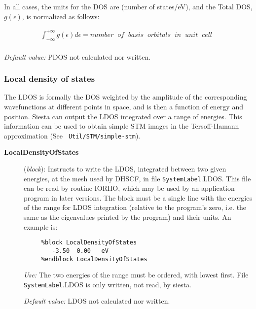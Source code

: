 \documentclass[11pt]{article}
\begin{document}
\begin{description}
In all cases, the units for the DOS are (number of states/eV), and the
Total DOS, $g \left(\epsilon\right)$, is normalized as follows:

\begin{eqnarray}
   \int_{-\infty}^{+\infty} g \left(\epsilon\right) d\epsilon =
   number \;\; of \;\; basis \;\; orbitals \;\; in \;\;  unit \;\; cell \;\;
   \nonumber \\
\end{eqnarray}


{\it Default value:} PDOS not calculated nor written.
\end{description}


\subsubsection{Local density of states}

The LDOS is formally the DOS weighted by the amplitude of the
corresponding wavefunctions at different points in space, and is then
a function of energy and position. {\sc Siesta} can output the LDOS
integrated over a range of energies.  This information can be used to
obtain simple STM images in the Tersoff-Hamann approximation (See {\tt
  Util/STM/simple-stm}).

\begin{description}
\item[{\bf LocalDensityOfStates}] ({\it block}):
Instructs to write the LDOS, integrated between two given energies,
at the mesh used by DHSCF,
in file {\tt SystemLabel}.LDOS. This file can be read by routine IORHO,
which may be used by an application program in later versions.
The block must be a single line with the energies of the range for
LDOS integration
(relative to the program's zero, i.e. the same as the eigenvalues
printed by the program) and their units.
An example is:

\begin{verbatim}
     %block LocalDensityOfStates
        -3.50  0.00   eV
     %endblock LocalDensityOfStates
\end{verbatim}

{\it Use:} The two energies of the range must be ordered,
with lowest first.
File {\tt SystemLabel}.LDOS is only written, not read, by siesta.

{\it Default value:} LDOS not calculated nor written.

\end{description}
\end{document}
